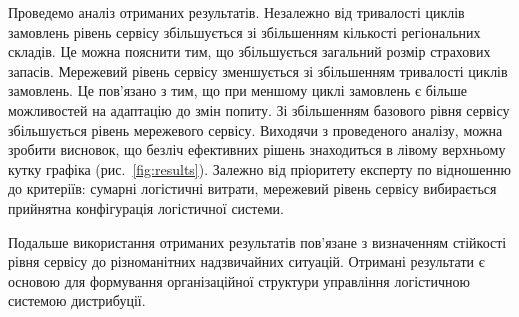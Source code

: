 Проведемо аналіз отриманих результатів.
Незалежно від тривалості циклів замовлень рівень сервісу збільшується зі збільшенням кількості регіональних складів.
Це можна пояснити тим, що збільшується загальний розмір страхових запасів.
Мережевий рівень сервісу зменшується зі збільшенням тривалості циклів замовлень. Це пов'язано з тим, що при меншому циклі замовлень є більше можливостей на адаптацію до змін попиту.
Зі збільшенням базового рівня сервісу збільшується рівень мережевого сервісу.
Виходячи з проведеного аналізу, можна зробити висновок, що безліч ефективних рішень знаходиться в лівому верхньому кутку графіка (рис.~\ref{fig:results}). Залежно від пріоритету експерту по відношенню до критеріїв: сумарні логістичні витрати, мережевий рівень сервісу вибирається прийнятна конфігурація логістичної системи.

Подальше використання отриманих результатів пов'язане з визначенням стійкості рівня сервісу до різноманітних надзвичайних ситуацій. Отримані результати є основою для формування організаційної структури управління логістичною системою дистрибуції.
